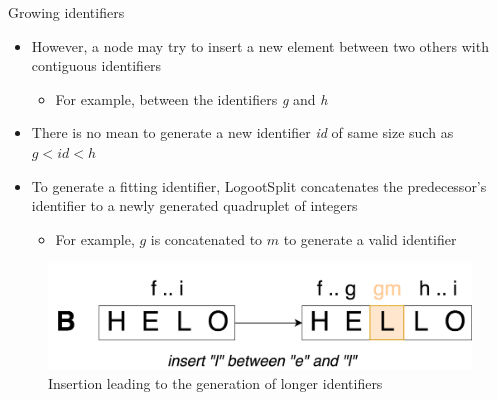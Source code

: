 \documentclass[10pt]{beamer}
\begin{document}
\begin{frame}{Growing identifiers}
  \begin{itemize}
    \item However, a node may try to insert a new element between two others with contiguous identifiers
    \begin{itemize}
      \item For example, between the identifiers \emph{g} and \emph{h}
    \end{itemize}
    \item There is no mean to generate a new identifier \emph{id} of same size such as $g < id < h$
    \item To generate a fitting identifier, LogootSplit concatenates the predecessor's identifier to a newly generated quadruplet of integers
    \begin{itemize}
      \item For example, $g$ is concatenated to $m$ to generate a valid identifier
    \end{itemize}
  \end{itemize}
  \begin{figure}
    \includegraphics[scale=0.15]{img/insert-between.png}
    \caption{Insertion leading to the generation of longer identifiers}
  \end{figure}
\end{frame}
\end{document}
